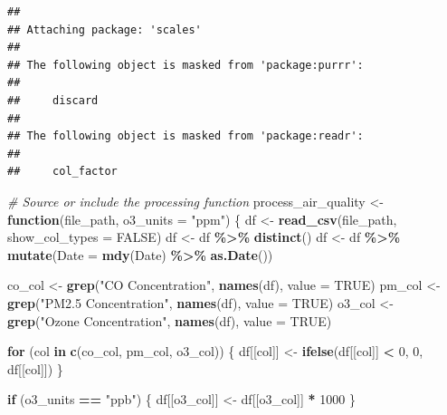 \documentclass[
]{article}
\newenvironment{Shaded}{\begin{snugshade}}{\end{snugshade}}
\newcommand{\AttributeTok}[1]{\textcolor[rgb]{0.13,0.29,0.53}{#1}}
\newcommand{\CommentTok}[1]{\textcolor[rgb]{0.56,0.35,0.01}{\textit{#1}}}
\newcommand{\ConstantTok}[1]{\textcolor[rgb]{0.56,0.35,0.01}{#1}}
\newcommand{\ControlFlowTok}[1]{\textcolor[rgb]{0.13,0.29,0.53}{\textbf{#1}}}
\newcommand{\DecValTok}[1]{\textcolor[rgb]{0.00,0.00,0.81}{#1}}
\newcommand{\FunctionTok}[1]{\textcolor[rgb]{0.13,0.29,0.53}{\textbf{#1}}}
\newcommand{\NormalTok}[1]{#1}
\newcommand{\OtherTok}[1]{\textcolor[rgb]{0.56,0.35,0.01}{#1}}
\newcommand{\SpecialCharTok}[1]{\textcolor[rgb]{0.81,0.36,0.00}{\textbf{#1}}}
\newcommand{\StringTok}[1]{\textcolor[rgb]{0.31,0.60,0.02}{#1}}
\begin{document}
\begin{verbatim}
## 
## Attaching package: 'scales'
## 
## The following object is masked from 'package:purrr':
## 
##     discard
## 
## The following object is masked from 'package:readr':
## 
##     col_factor
\end{verbatim}

\begin{Shaded}
\begin{Highlighting}[]
\CommentTok{\# Source or include the processing function}
\NormalTok{process\_air\_quality }\OtherTok{\textless{}{-}} \ControlFlowTok{function}\NormalTok{(file\_path, }\AttributeTok{o3\_units =} \StringTok{"ppm"}\NormalTok{) \{}
\NormalTok{  df }\OtherTok{\textless{}{-}} \FunctionTok{read\_csv}\NormalTok{(file\_path, }\AttributeTok{show\_col\_types =} \ConstantTok{FALSE}\NormalTok{)}
\NormalTok{  df }\OtherTok{\textless{}{-}}\NormalTok{ df }\SpecialCharTok{\%\textgreater{}\%} \FunctionTok{distinct}\NormalTok{()}
\NormalTok{  df }\OtherTok{\textless{}{-}}\NormalTok{ df }\SpecialCharTok{\%\textgreater{}\%} \FunctionTok{mutate}\NormalTok{(}\AttributeTok{Date =} \FunctionTok{mdy}\NormalTok{(Date) }\SpecialCharTok{\%\textgreater{}\%} \FunctionTok{as.Date}\NormalTok{())}
  
\NormalTok{  co\_col }\OtherTok{\textless{}{-}} \FunctionTok{grep}\NormalTok{(}\StringTok{"CO Concentration"}\NormalTok{, }\FunctionTok{names}\NormalTok{(df), }\AttributeTok{value =} \ConstantTok{TRUE}\NormalTok{)}
\NormalTok{  pm\_col }\OtherTok{\textless{}{-}} \FunctionTok{grep}\NormalTok{(}\StringTok{"PM2.5 Concentration"}\NormalTok{, }\FunctionTok{names}\NormalTok{(df), }\AttributeTok{value =} \ConstantTok{TRUE}\NormalTok{)}
\NormalTok{  o3\_col }\OtherTok{\textless{}{-}} \FunctionTok{grep}\NormalTok{(}\StringTok{"Ozone Concentration"}\NormalTok{, }\FunctionTok{names}\NormalTok{(df), }\AttributeTok{value =} \ConstantTok{TRUE}\NormalTok{)}
  
  \ControlFlowTok{for}\NormalTok{ (col }\ControlFlowTok{in} \FunctionTok{c}\NormalTok{(co\_col, pm\_col, o3\_col)) \{}
\NormalTok{    df[[col]] }\OtherTok{\textless{}{-}} \FunctionTok{ifelse}\NormalTok{(df[[col]] }\SpecialCharTok{\textless{}} \DecValTok{0}\NormalTok{, }\DecValTok{0}\NormalTok{, df[[col]])}
\NormalTok{  \}}
  
  \ControlFlowTok{if}\NormalTok{ (o3\_units }\SpecialCharTok{==} \StringTok{"ppb"}\NormalTok{) \{}
\NormalTok{    df[[o3\_col]] }\OtherTok{\textless{}{-}}\NormalTok{ df[[o3\_col]] }\SpecialCharTok{*} \DecValTok{1000}
\NormalTok{  \}}
  

\end{Highlighting}
\end{Shaded}
\end{document}
